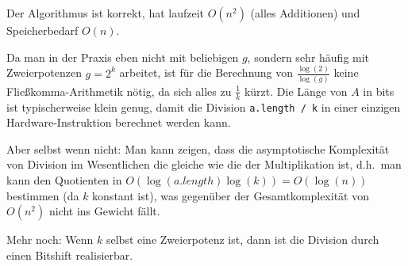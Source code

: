 \begin{proposition}
    Der Algorithmus ist korrekt, hat laufzeit $O(n^2)$ (alles Additionen) und Speicherbedarf $O(n)$.
\end{proposition}

\begin{remark}
    Da man in der Praxis eben nicht mit beliebigen $g$, sondern sehr häufig mit Zweierpotenzen $g=2^k$ arbeitet, ist für die Berechnung von $\frac{\log(2)}{\log(g)}$ keine Fließkomma-Arithmetik nötig, da sich alles zu $\frac{1}{k}$ kürzt. Die Länge von $A$ in bits ist typischerweise klein genug, damit die Division \lstinline{a.length / k} in einer einzigen Hardware-Instruktion berechnet werden kann.

    \smallskip
    Aber selbst wenn nicht: Man kann zeigen, dass die asymptotische Komplexität von Division im Wesentlichen die gleiche wie die der Multiplikation ist, d.h.\ man kann den Quotienten in $O(\log(a.length)\log(k)) = O(\log(n))$ bestimmen (da $k$ konstant ist), was gegenüber der Gesamtkomplexität von $O(n^2)$ nicht ins Gewicht fällt.

    \smallskip
    Mehr noch: Wenn $k$ selbst eine Zweierpotenz ist, dann ist die Division durch einen Bitshift realisierbar.
\end{remark}

